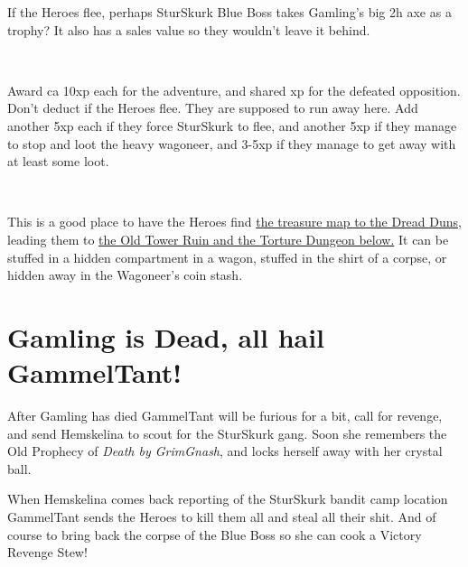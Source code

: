 If the Heroes flee, perhaps SturSkurk Blue Boss takes Gamling's big 2h axe as a trophy? It also has a sales value so they wouldn't leave it behind.

\

Award ca 10xp each for the adventure, and shared xp for the defeated opposition. Don't deduct if the Heroes flee. They are supposed to run away here. Add another 5xp each if they force SturSkurk to flee, and another 5xp if they manage to stop and loot the heavy wagoneer, and 3-5xp if they manage to get away with at least some loot.

\

This is a good place to have the Heroes find  
\hyperref[appendixtreasuremap]{the treasure map to the Dread Duns,} 
leading them to 
\hyperref[xxtorturedungeon]{the Old Tower Ruin and the Torture Dungeon below.} 
It can be stuffed in a hidden compartment in a wagon, stuffed in the shirt of a corpse, or hidden away in the Wagoneer's coin stash.





\vfill
{}
\section*{Gamling is Dead, all hail GammelTant!}

After Gamling has died GammelTant will be furious for a bit, call for revenge, and send Hemskelina to scout for the SturSkurk gang. Soon she remembers the Old Prophecy of \emph{Death by GrimGnash}, and locks herself away with her crystal ball.

When Hemskelina comes back reporting of the SturSkurk bandit camp location GammelTant sends the Heroes to kill them all and steal all their shit. And of course to bring back the corpse of the Blue Boss so she can cook a Victory Revenge Stew!










\clearpage
